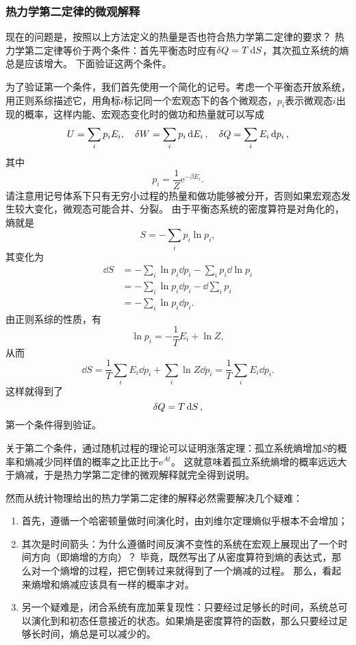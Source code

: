 \documentclass[hyperref, UTF8, a4paper]{ctexart}
\newcommand*{\ee}{\mathrm{e}}
\begin{document}
\subsubsection{热力学第二定律的微观解释}

现在的问题是，按照以上方法定义的热量是否也符合热力学第二定律的要求？
热力学第二定律等价于两个条件：首先平衡态时应有$\var{Q}=T\dd{S}$，其次孤立系统的熵总是应该增大。
下面验证这两个条件。

为了验证第一个条件，我们首先使用一个简化的记号。考虑一个平衡态开放系统，用正则系综描述它，用角标$i$标记同一个宏观态下的各个微观态，$p_i$表示微观态$i$出现的概率，这样内能、宏观态变化时的做功和热量就可以写成
\[
    U = \sum_i p_i E_i, \quad \var{W} = \sum_i p_i \dd{E_i}, \quad \var{Q} = \sum_i E_i \dd{p_i},
\]
其中
\[
    p_i = \frac{1}{Z} \ee^{- \beta E_i}.
\]
请注意用记号体系下只有无穷小过程的热量和做功能够被分开，否则如果宏观态发生较大变化，微观态可能合并、分裂。
由于平衡态系统的密度算符是对角化的，熵就是
\[
    S = - \sum_i p_i \ln p_i,
\]
其变化为
\[
    \begin{aligned}
        \dd{S} &= - \sum_i \ln p_i \dd{p_i} - \sum_i p_i \dd{\ln p_i} \\
        &= - \sum_i \ln p_i \dd{p_i} - \dd{\sum_i p_i} \\
        &= - \sum_i \ln p_i \dd{p_i}.
    \end{aligned}
\]
由正则系综的性质，有
\[
    \ln p_i = - \frac{1}{T} E_i + \ln Z ,
\]
从而
\[
    \dd{S} = \frac{1}{T} \sum_i E_i \dd{p_i} + \sum_i \ln Z \dd{p_i} = \frac{1}{T} \sum_i E_i \dd{p_i}.
\]
这样就得到了
\[
    \var{Q} = T \dd{S},
\]
第一个条件得到验证。

关于第二个条件，通过随机过程的理论可以证明涨落定理：孤立系统熵增加$S$的概率和熵减少同样值的概率之比正比于$\ee^{At}$。
这就意味着孤立系统熵增的概率远远大于熵减，于是热力学第二定律的微观解释就完全得到说明。

然而从统计物理给出的热力学第二定律的解释必然需要解决几个疑难：
\begin{enumerate}
    \item 首先，遵循一个哈密顿量做时间演化时，由刘维尔定理熵似乎根本不会增加；
    \item 其次是时间箭头：为什么遵循时间反演不变性的系统在宏观上展现出了一个时间方向（即熵增的方向）？
    毕竟，既然写出了从密度算符到熵的表达式，那么对一个熵增的过程，把它倒转过来就得到了一个熵减的过程。
    那么，看起来熵增和熵减应该具有一样的概率才对。
    \item 另一个疑难是，闭合系统有庞加莱复现性：只要经过足够长的时间，系统总可以演化到和初态任意接近的状态。如果熵是密度算符的函数，那么只要经过足够长时间，熵总是可以减少的。
\end{enumerate}
\end{document}
